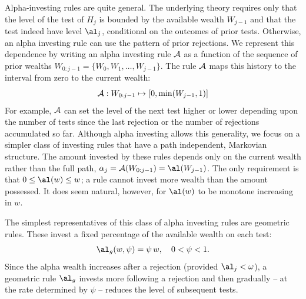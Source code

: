 \documentclass[12pt]{article}
\begin{document}
 
 Alpha-investing rules are quite general.  The underlying theory requires only
 that the level of the test of $H_j$ is bounded by the available wealth
 $W_{j-1}$ and that the test indeed have level $\al_j$, conditional on the
 outcomes of prior tests.  Otherwise, an alpha investing rule can use the
 pattern of prior rejections.  We represent
 this dependence by writing an alpha investing rule ${\cal A}$ as a function of the
 sequence of prior wealths $W_{0:j-1} = \{W_0, W_1, \ldots, W_{j-1}\}$.  The rule
 $\cal A$ maps this history to the interval from zero to the current wealth:
 \begin{equation}
    {\cal A}: W_{0:j-1} \mapsto [0, \min(W_{j-1},1)]    
 \label{eq:A}
 \end{equation}
 For example, $\cal A$ can set the level of the next test higher or lower
 depending upon the number of tests since the last rejection or the number of
 rejections accumulated so far.  Although alpha investing allows this
 generality, we focus on a simpler class of investing rules that have a path
 independent, Markovian structure.  The amount invested by these rules depends
 only on the current wealth rather than the full path, $\alpha_j = {\cal
 A}(W_{0:j-1}) = \al(W_{j-1})$.  The only requirement is that $0 \le \al(w) \le w$; a
 rule cannot invest more wealth than the amount possessed.  It does seem
 natural, however, for $\al(w)$ to be monotone increasing in $w$.




 The simplest representatives of this class of alpha investing rules are
 geometric rules.  These invest a fixed percentage of the available wealth on
 each test:
 \begin{equation}
    \al_g(w, \psi) = \psi \, w, \quad  0 < \psi < 1.
 \label{eq:Ageo}
 \end{equation}
 Since the alpha wealth increases after a rejection (provided $\al_j < \omega$), a geometric rule $\al_g$
 invests more following a rejection and then gradually -- at the rate determined
 by $\psi$ -- reduces the level of subsequent tests.
\end{document}

